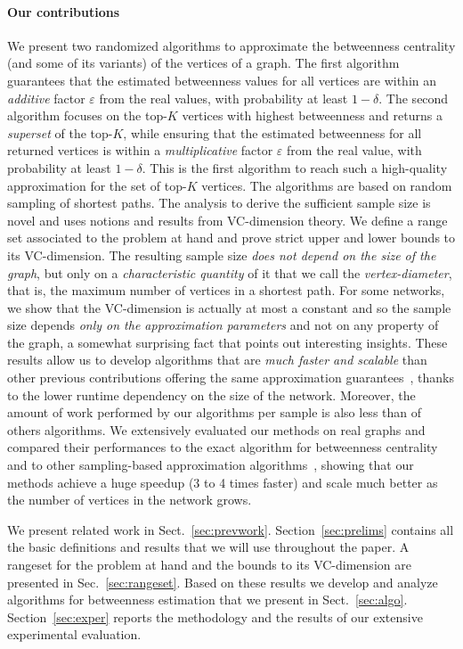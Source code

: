 \paragraph{Our contributions} 
We present two randomized algorithms to approximate the betweenness centrality
(and some of its variants) of the vertices of a graph. The first algorithm
guarantees that the estimated betweenness values for all vertices are within an
\emph{additive} factor $\varepsilon$ from the real values, with probability at
least $1-\delta$. The second algorithm focuses on the top-$K$ vertices with
highest betweenness and returns a \emph{superset} of the top-$K$,
while ensuring that the estimated betweenness for all returned vertices is
within a \emph{multiplicative} factor $\varepsilon$ from the real value, with
probability at least $1-\delta$. This is the first algorithm to reach such a
high-quality approximation for the set of top-$K$ vertices. The algorithms are
based on random sampling of shortest paths. The analysis to derive the
sufficient sample size is novel and uses notions and results from VC-dimension
theory. We define a range set associated to the problem at hand and prove strict
upper and lower bounds to its VC-dimension. The resulting sample size \emph{does not
depend on the size of the graph}, but only on a \emph{characteristic quantity} of it
that we call the \emph{vertex-diameter}, that is, the maximum number of vertices
in a shortest path. For some networks, we show that the VC-dimension is actually
at most a constant and so the sample size depends \emph{only on the approximation
parameters} and not on any property of the graph, a somewhat surprising fact
that points out interesting insights. These results allow us to develop
algorithms that are \emph{much faster and scalable} than other previous
contributions offering the same approximation
guarantees~\citep{JacobKLPT05,BrandesP07,GeisbergerSS08}, thanks to the lower
runtime dependency on the size of the network. Moreover, the amount of work
performed by our algorithms per sample is also less than of others algorithms.
We extensively evaluated our methods on real graphs and compared their
performances to the exact algorithm for betweenness centrality~\citep{Brandes01}
and to other sampling-based approximation
algorithms~\citep{JacobKLPT05,BrandesP07,GeisbergerSS08}, showing that our
methods achieve a huge speedup (3 to 4 times faster) and scale much better as
the number of vertices in the network grows.

We present related work in Sect.~\ref{sec:prevwork}. Section~\ref{sec:prelims}
contains all the basic definitions and results that we will use throughout the
paper. A rangeset for the problem at hand and the bounds to its VC-dimension
are presented in Sec.~\ref{sec:rangeset}. Based on these results we develop and
analyze algorithms for betweenness estimation that we present in
Sect.~\ref{sec:algo}. Section~\ref{sec:exper} reports the methodology and
the results of our extensive experimental evaluation.

